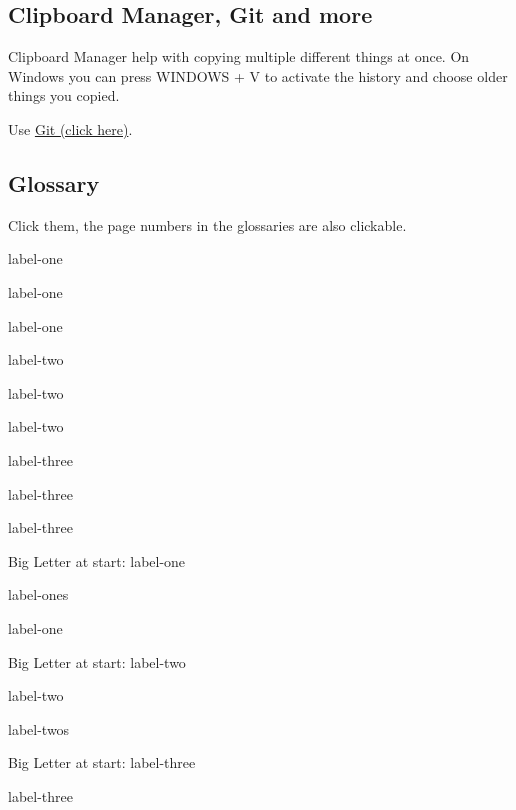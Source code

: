 \subsection{Clipboard Manager, Git and more}

Clipboard Manager help with copying multiple different things at once.
On Windows you can press WINDOWS + V to activate the history
and choose older things you copied.

Use \href{https://www.youtube.com/watch?v=hwP7WQkmECE&pp=ygUDZ2l0}{Git (click here)}.

\subsection{Glossary}

Click them, the page numbers in the glossaries are also clickable.

\gls{label-one}

\gls{label-one}

\gls{label-one}

\gls{label-two}

\gls{label-two}

\gls{label-two}

\gls{label-three}

\gls{label-three}

\gls{label-three}

\newpage

Big Letter at start: \Gls{label-one}

\glspl{label-one}

\gls{label-one}

Big Letter at start: \Gls{label-two}

\gls{label-two}

\glspl{label-two}

Big Letter at start: \Gls{label-three}

\gls{label-three}

